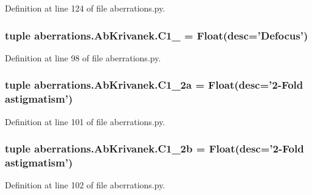 Definition at line 124 of file aberrations.\-py.

\hypertarget{classaberrations_1_1_ab_krivanek_a67551c9dcb755773d0d4d68ddddbb0c1}{
\subsubsection[{C1\-\_\-0}]{\setlength{\rightskip}{0pt plus 5cm}tuple aberrations.\-Ab\-Krivanek.\-C1\-\_ = Float(desc='{\bf Defocus}')\hspace{0.3cm}{\ttfamily [static]}}}\label{classaberrations_1_1_ab_krivanek_a67551c9dcb755773d0d4d68ddddbb0c1}


Definition at line 98 of file aberrations.\-py.

\hypertarget{classaberrations_1_1_ab_krivanek_a6743d32a0185f0c0cb00cb1b4dca36f4}{
\subsubsection[{C1\-\_\-2a}]{\setlength{\rightskip}{0pt plus 5cm}tuple aberrations.\-Ab\-Krivanek.\-C1\-\_\-2a = Float(desc='2-\/Fold astigmatism')\hspace{0.3cm}{\ttfamily [static]}}}\label{classaberrations_1_1_ab_krivanek_a6743d32a0185f0c0cb00cb1b4dca36f4}


Definition at line 101 of file aberrations.\-py.

\hypertarget{classaberrations_1_1_ab_krivanek_a8835ee7c475ae556be69a14a99f733ea}{
\subsubsection[{C1\-\_\-2b}]{\setlength{\rightskip}{0pt plus 5cm}tuple aberrations.\-Ab\-Krivanek.\-C1\-\_\-2b = Float(desc='2-\/Fold astigmatism')\hspace{0.3cm}{\ttfamily [static]}}}\label{classaberrations_1_1_ab_krivanek_a8835ee7c475ae556be69a14a99f733ea}


Definition at line 102 of file aberrations.\-py.

